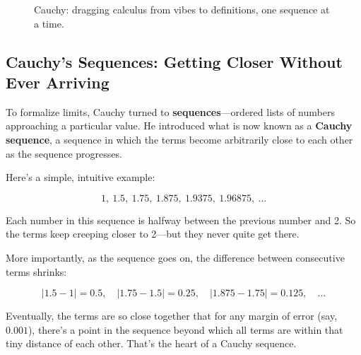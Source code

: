\begin{figure}[H]
\centering
{}
\caption{Cauchy: dragging calculus from vibes to definitions, one sequence at a time.}
\end{figure}


\subsection{Cauchy’s Sequences: Getting Closer Without Ever Arriving}

To formalize limits, Cauchy turned to \textbf{sequences}—ordered lists of numbers approaching a particular value. He introduced what is now known as a \textbf{Cauchy sequence}, a sequence in which the terms become arbitrarily close to each other as the sequence progresses.

Here’s a simple, intuitive example:

\[
1,\ 1.5,\ 1.75,\ 1.875,\ 1.9375,\ 1.96875,\ \dots
\]

Each number in this sequence is halfway between the previous number and 2. So the terms keep creeping closer to 2—but they never quite get there.

More importantly, as the sequence goes on, the difference between consecutive terms shrinks:

\[
|1.5 - 1| = 0.5,\quad |1.75 - 1.5| = 0.25,\quad |1.875 - 1.75| = 0.125,\quad \dots
\]

Eventually, the terms are so close together that for any margin of error (say, $0.001$), there’s a point in the sequence beyond which all terms are within that tiny distance of each other. That’s the heart of a Cauchy sequence.

